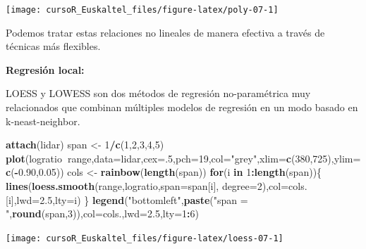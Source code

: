 \documentclass[]{book}
\newenvironment{Shaded}{\begin{snugshade}}{\end{snugshade}}
\newcommand{\KeywordTok}[1]{\textcolor[rgb]{0.13,0.29,0.53}{\textbf{#1}}}
\newcommand{\DataTypeTok}[1]{\textcolor[rgb]{0.13,0.29,0.53}{#1}}
\newcommand{\DecValTok}[1]{\textcolor[rgb]{0.00,0.00,0.81}{#1}}
\newcommand{\FloatTok}[1]{\textcolor[rgb]{0.00,0.00,0.81}{#1}}
\newcommand{\StringTok}[1]{\textcolor[rgb]{0.31,0.60,0.02}{#1}}
\newcommand{\ControlFlowTok}[1]{\textcolor[rgb]{0.13,0.29,0.53}{\textbf{#1}}}
\newcommand{\OperatorTok}[1]{\textcolor[rgb]{0.81,0.36,0.00}{\textbf{#1}}}
\newcommand{\NormalTok}[1]{#1}
\begin{document}
\begin{center}\texttt{[image: cursoR\_Euskaltel\_files/figure-latex/poly-07-1]} \end{center}

Podemos tratar estas relaciones no lineales de manera efectiva a través
de técnicas más flexibles.

\textbf{Regresión local:}

LOESS y LOWESS son dos métodos de regresión no-paramétrica muy
relacionados que combinan múltiples modelos de regresión en un modo
basado en k-neast-neighbor.

\begin{Shaded}
\begin{Highlighting}[]
\KeywordTok{attach}\NormalTok{(lidar)}
\NormalTok{span <-}\StringTok{ }\DecValTok{1}\OperatorTok{/}\KeywordTok{c}\NormalTok{(}\DecValTok{1}\NormalTok{,}\DecValTok{2}\NormalTok{,}\DecValTok{3}\NormalTok{,}\DecValTok{4}\NormalTok{,}\DecValTok{5}\NormalTok{)}
\KeywordTok{plot}\NormalTok{(logratio}\OperatorTok{~}\NormalTok{range,}\DataTypeTok{data=}\NormalTok{lidar,}\DataTypeTok{cex=}\NormalTok{.}\DecValTok{5}\NormalTok{,}\DataTypeTok{pch=}\DecValTok{19}\NormalTok{,}\DataTypeTok{col=}\StringTok{"grey"}\NormalTok{,}\DataTypeTok{xlim=}\KeywordTok{c}\NormalTok{(}\DecValTok{380}\NormalTok{,}\DecValTok{725}\NormalTok{),}\DataTypeTok{ylim=}\KeywordTok{c}\NormalTok{(}\OperatorTok{-}\FloatTok{0.90}\NormalTok{,}\FloatTok{0.05}\NormalTok{))}
\NormalTok{cols <-}\StringTok{ }\KeywordTok{rainbow}\NormalTok{(}\KeywordTok{length}\NormalTok{(span))}
\ControlFlowTok{for}\NormalTok{(i }\ControlFlowTok{in} \DecValTok{1}\OperatorTok{:}\KeywordTok{length}\NormalTok{(span))\{}
  \KeywordTok{lines}\NormalTok{(}\KeywordTok{loess.smooth}\NormalTok{(range,logratio,}\DataTypeTok{span=}\NormalTok{span[i], }\DataTypeTok{degree=}\DecValTok{2}\NormalTok{),}\DataTypeTok{col=}\NormalTok{cols.[i],}\DataTypeTok{lwd=}\FloatTok{2.5}\NormalTok{,}\DataTypeTok{lty=}\NormalTok{i)}
\NormalTok{\}}
\KeywordTok{legend}\NormalTok{(}\StringTok{"bottomleft"}\NormalTok{,}\KeywordTok{paste}\NormalTok{(}\StringTok{"span = "}\NormalTok{,}\KeywordTok{round}\NormalTok{(span,}\DecValTok{3}\NormalTok{)),}\DataTypeTok{col=}\NormalTok{cols.,}\DataTypeTok{lwd=}\FloatTok{2.5}\NormalTok{,}\DataTypeTok{lty=}\DecValTok{1}\OperatorTok{:}\DecValTok{6}\NormalTok{)}
\end{Highlighting}
\end{Shaded}

\begin{center}\texttt{[image: cursoR\_Euskaltel\_files/figure-latex/loess-07-1]} \end{center}
\end{document}
